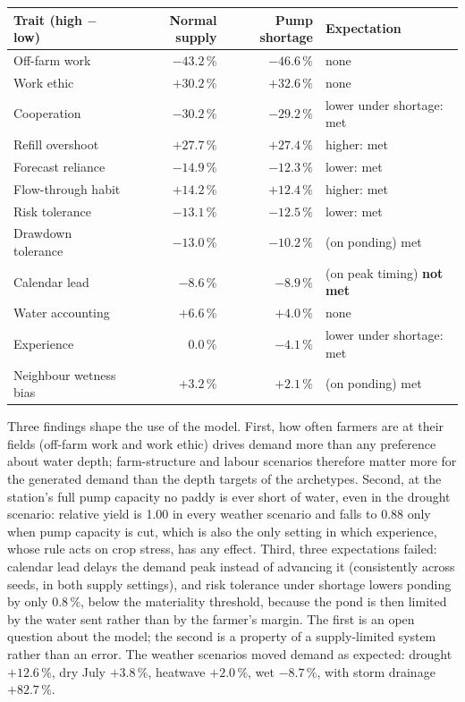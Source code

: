 \documentclass{article}
\begin{document}
\begin{added}
\medskip
\centering
\small
\begin{tabular}{lrrl}
\toprule
\textbf{Trait (high $-$ low)} & \textbf{Normal supply} & \textbf{Pump shortage} & \textbf{Expectation} \\ \midrule
Off-farm work & $-43.2\,\%$ & $-46.6\,\%$ & none \\
Work ethic & $+30.2\,\%$ & $+32.6\,\%$ & none \\
Cooperation & $-30.2\,\%$ & $-29.2\,\%$ & lower under shortage: met \\
Refill overshoot & $+27.7\,\%$ & $+27.4\,\%$ & higher: met \\
Forecast reliance & $-14.9\,\%$ & $-12.3\,\%$ & lower: met \\
Flow-through habit & $+14.2\,\%$ & $+12.4\,\%$ & higher: met \\
Risk tolerance & $-13.1\,\%$ & $-12.5\,\%$ & lower: met \\
Drawdown tolerance & $-13.0\,\%$ & $-10.2\,\%$ & (on ponding) met \\
Calendar lead & $-8.6\,\%$ & $-8.9\,\%$ & (on peak timing) \textbf{not met} \\
Water accounting & $+6.6\,\%$ & $+4.0\,\%$ & none \\
Experience & $0.0\,\%$ & $-4.1\,\%$ & lower under shortage: met \\
Neighbour wetness bias & $+3.2\,\%$ & $+2.1\,\%$ & (on ponding) met \\ \bottomrule
\end{tabular}
\label{tab:trait_effects}

\raggedright
Three findings shape the use of the model. First, how often farmers are at their fields (off-farm work and work ethic) drives demand more than any preference about water depth; farm-structure and labour scenarios therefore matter more for the generated demand than the depth targets of the archetypes. Second, at the station's full pump capacity no paddy is ever short of water, even in the drought scenario: relative yield is 1.00 in every weather scenario and falls to 0.88 only when pump capacity is cut, which is also the only setting in which experience, whose rule acts on crop stress, has any effect. Third, three expectations failed: calendar lead delays the demand peak instead of advancing it (consistently across seeds, in both supply settings), and risk tolerance under shortage lowers ponding by only 0.8\,\%, below the materiality threshold, because the pond is then limited by the water sent rather than by the farmer's margin. The first is an open question about the model; the second is a property of a supply-limited system rather than an error. The weather scenarios moved demand as expected: drought $+12.6\,\%$, dry July $+3.8\,\%$, heatwave $+2.0\,\%$, wet $-8.7\,\%$, with storm drainage $+82.7\,\%$.


\end{added}
\end{document}
